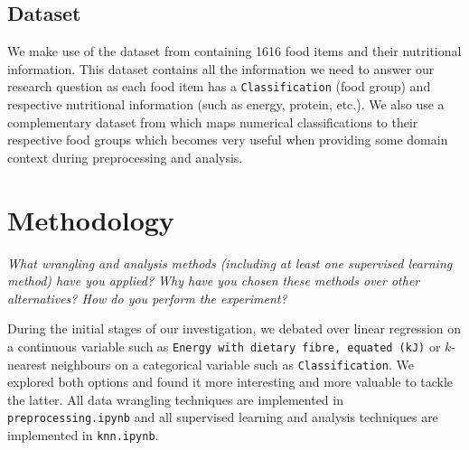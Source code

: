 \documentclass[11pt]{article}
\begin{document}



\subsection{Dataset}
We make use of the dataset from \cite{FoodStandardsAustraliaNewZealand} containing 1616 food items and their nutritional information. This dataset contains all the information we need to answer our research question as each food item has a \verb|Classification| (food group) and respective nutritional information (such as energy, protein, etc.). We also use a complementary dataset from \cite{FoodClassification} which maps numerical classifications to their respective food groups which becomes very useful when providing some domain context during preprocessing and analysis.

\section{Methodology}

\emph{What wrangling and analysis methods (including at least one supervised learning method) have you applied? Why have you chosen these methods over other alternatives? How do you perform the experiment?}

During the initial stages of our investigation, we debated over linear regression on a continuous variable such as \verb|Energy with dietary fibre, equated (kJ)| or $k$-nearest neighbours on a categorical variable such as \verb|Classification|. We explored both options and found it more interesting and more valuable to tackle the latter. All data wrangling techniques are implemented in \verb|preprocessing.ipynb| and all supervised learning and analysis techniques are implemented in \verb|knn.ipynb|.
\end{document}
